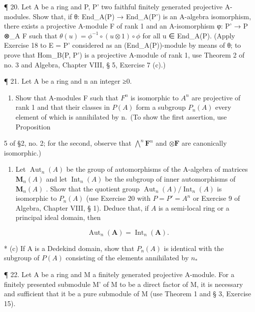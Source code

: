 ¶ 20. Let A be a ring and P, P' two faithful finitely generated projective A-modules. Show that, if θ: End\_A(P) → End\_A(P') is an A-algebra isomorphism, there exists a projective A-module F of rank 1 and an A-isomorphism φ: P' → P ⊗\_A F such that \(\theta(u) = \phi^{-1} \circ (u \otimes 1) \circ \phi\) for all u ∈ End\_A(P). (Apply Exercise 18 to E = P' considered as an (End\_A(P))-module by means of θ; to prove that Hom\_B(P, P') is a projective A-module of rank 1, use Theorem 2 of no. 3 and Algebra, Chapter VIII, § 5, Exercise 7 (c).)

¶ 21. Let A be a ring and n an integer ≥0.

\begin{enumerate}
\def\labelenumi{(\alph{enumi})}
\tightlist
\item
  Show that A-modules F such that \(F^{n}\) is isomorphic to \(A^{n}\) are projective of rank 1 and that their classes in \(P(A)\) form a subgroup \(P_{n}(A)\) every element of which is annihilated by n.~(To show the first assertion, use Proposition
\end{enumerate}

5 of §2, no. 2; for the second, observe that \(\bigwedge^{n} \mathbf{F}^{n}\) and \(\otimes \mathbf{F}\) are canonically isomorphic.)

\begin{enumerate}
\def\labelenumi{(\alph{enumi})}
\setcounter{enumi}{1}
\tightlist
\item
  Let \(\operatorname{Aut}_n(A)\) be the group of automorphisms of the A-algebra of matrices \(\mathbf{M}_n(A)\) and let \(\operatorname{Int}_n(A)\) be the subgroup of inner automorphisms of \(\mathbf{M}_n(A)\) . Show that the quotient group \(\operatorname{Aut}_n(A)/\operatorname{Int}_n(A)\) is isomorphic to \(P_n(A)\) (use Exercise 20 with \(P = P' = A^n\) or Exercise 9 of Algebra, Chapter VIII, § 1). Deduce that, if \(A\) is a semi-local ring or a principal ideal domain, then
\end{enumerate}

\[
\operatorname{Aut} _ {n} (\mathbf {A}) = \operatorname{Int} _ {n} (\mathbf {A}).
\]

* (c) If A is a Dedekind domain, show that \(P_{n}(A)\) is identical with the subgroup of \(P(A)\) consisting of the elements annihilated by \(n_*\)

¶ 22. Let A be a ring and M a finitely generated projective A-module. For a finitely presented submodule M' of M to be a direct factor of M, it is necessary and sufficient that it be a pure submodule of M (use Theorem 1 and § 3, Exercise 15).

